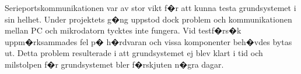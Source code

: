\documentclass[a4paper]{article}
\begin{document}
Serieportskommunikationen var av stor vikt f�r att kunna testa grundsystemet i sin helhet. Under projektets g�ng uppstod dock problem och kommunikationen mellan PC och mikrodatorn tycktes inte fungera. Vid testf�rs�k uppm�rksammades fel p� h�rdvaran och vissa komponenter beh�vdes bytas ut. Detta problem resulterade i att grundsystemet ej blev klart i tid och milstolpen f�r grundsystemet bler f�rskjuten n�gra dagar.









\end{document}

